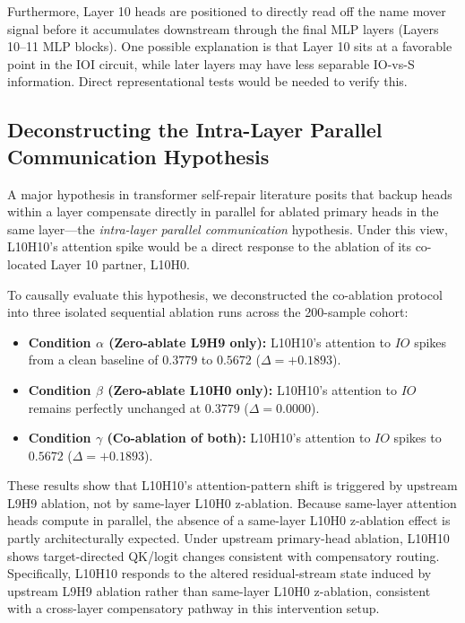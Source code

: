 \documentclass[10pt]{article} %
\begin{document}
Furthermore, Layer 10 heads are positioned to directly read off the name mover
signal before it accumulates downstream through the final MLP layers
(Layers 10--11 MLP blocks). One possible explanation is that Layer 10 sits at a
favorable point in the IOI circuit, while later layers may have less separable
IO-vs-S information. Direct representational tests would be needed to verify this.

\subsection{Deconstructing the Intra-Layer Parallel Communication Hypothesis}
\label{subsec:isolation}

A major hypothesis in transformer self-repair literature posits that backup heads within a layer compensate directly in parallel for ablated primary heads in the same layer---the \emph{intra-layer parallel communication} hypothesis. Under this view, L10H10's attention spike would be a direct response to the ablation of its co-located Layer 10 partner, L10H0. 

To causally evaluate this hypothesis, we deconstructed the co-ablation protocol into three isolated sequential ablation runs across the 200-sample cohort:
\begin{itemize}
  \item \textbf{Condition $\alpha$ (Zero-ablate L9H9 only):} L10H10's attention to $IO$ spikes from a clean baseline of $0.3779$ to $0.5672$ ($\Delta = +0.1893$).
  \item \textbf{Condition $\beta$ (Zero-ablate L10H0 only):} L10H10's attention to $IO$ remains perfectly unchanged at $0.3779$ ($\Delta = 0.0000$).
  \item \textbf{Condition $\gamma$ (Co-ablation of both):} L10H10's attention to $IO$ spikes to $0.5672$ ($\Delta = +0.1893$).
\end{itemize}

These results show that L10H10's attention-pattern shift is triggered by upstream L9H9 ablation, not by same-layer L10H0 z-ablation. Because same-layer attention heads compute in parallel, the absence of a same-layer L10H0 z-ablation effect is partly architecturally expected. Under upstream primary-head ablation, L10H10 shows target-directed QK/logit changes consistent with compensatory routing. Specifically, L10H10 responds to the altered residual-stream state induced by upstream L9H9 ablation rather than same-layer L10H0 z-ablation, consistent with a cross-layer compensatory pathway in this intervention setup.
\end{document}
